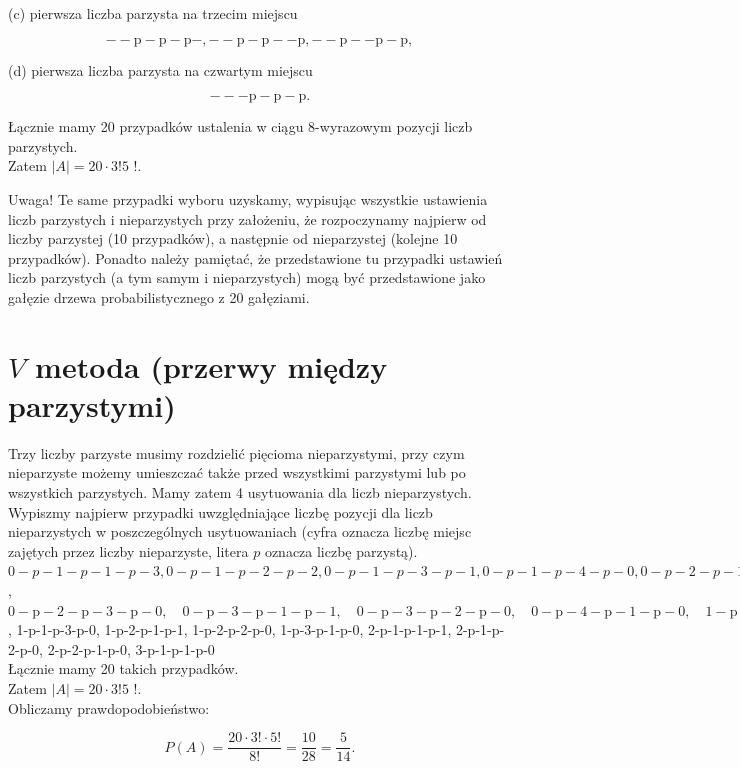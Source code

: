 \documentclass[10pt]{article}
\begin{document}
(c) pierwsza liczba parzysta na trzecim miejscu

$$
--\mathrm{p}-\mathrm{p}-\mathrm{p}-,--\mathrm{p}-\mathrm{p}--\mathrm{p},--\mathrm{p}--\mathrm{p}-\mathrm{p},
$$

(d) pierwsza liczba parzysta na czwartym miejscu

$$
---\mathrm{p}-\mathrm{p}-\mathrm{p} .
$$

Łącznie mamy 20 przypadków ustalenia w ciągu 8-wyrazowym pozycji liczb parzystych.\\
Zatem $|A|=20 \cdot 3!5$ !.

Uwaga! Te same przypadki wyboru uzyskamy, wypisując wszystkie ustawienia liczb parzystych i nieparzystych przy założeniu, że rozpoczynamy najpierw od liczby parzystej (10 przypadków), a następnie od nieparzystej (kolejne 10 przypadków). Ponadto należy pamiętać, że przedstawione tu przypadki ustawień liczb parzystych (a tym samym i nieparzystych) mogą być przedstawione jako gałęzie drzewa probabilistycznego z 20 gałęziami.

\section*{$V$ metoda (przerwy między parzystymi)}
Trzy liczby parzyste musimy rozdzielić pięcioma nieparzystymi, przy czym nieparzyste możemy umieszczać także przed wszystkimi parzystymi lub po wszystkich parzystych. Mamy zatem 4 usytuowania dla liczb nieparzystych.\\
Wypiszmy najpierw przypadki uwzględniające liczbę pozycji dla liczb nieparzystych w poszczególnych usytuowaniach (cyfra oznacza liczbę miejsc zajętych przez liczby nieparzyste, litera $p$ oznacza liczbę parzystą).\\
$0-p-1-p-1-p-3,0-p-1-p-2-p-2,0-p-1-p-3-p-1,0-p-1-p-4-p-0,0-p-2-p-1-p-2,0-p-2-p-2-p-1$,\\
$0-\mathrm{p}-2-\mathrm{p}-3-\mathrm{p}-0, \quad 0-\mathrm{p}-3-\mathrm{p}-1-\mathrm{p}-1, \quad 0-\mathrm{p}-3-\mathrm{p}-2-\mathrm{p}-0, \quad 0-\mathrm{p}-4-\mathrm{p}-1-\mathrm{p}-0, \quad 1-\mathrm{p}-1-\mathrm{p}-1-\mathrm{p}-1,1-\mathrm{p}-1-\mathrm{p}-2-\mathrm{p}-1$, 1-p-1-p-3-p-0, 1-p-2-p-1-p-1, 1-p-2-p-2-p-0, 1-p-3-p-1-p-0, 2-p-1-p-1-p-1, 2-p-1-p-2-p-0, 2-p-2-p-1-p-0, 3-p-1-p-1-p-0\\
Łącznie mamy 20 takich przypadków.\\
Zatem $|A|=20 \cdot 3!5$ !.\\
Obliczamy prawdopodobieństwo:

$$
P(A)=\frac{20 \cdot 3!\cdot 5!}{8!}=\frac{10}{28}=\frac{5}{14} .
$$
\end{document}
